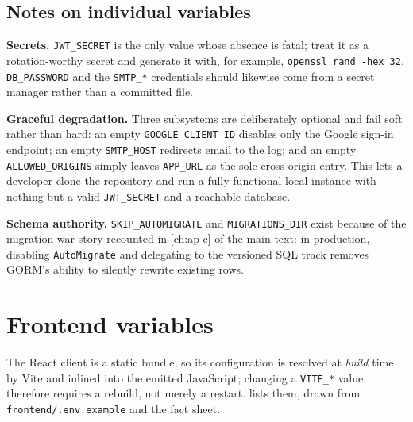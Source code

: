 \subsection{Notes on individual variables}

\textbf{Secrets.} \texttt{JWT\_SECRET} is the only value whose absence is fatal; treat it as a rotation-worthy secret and generate it with, for example, \texttt{openssl rand -hex 32}. \texttt{DB\_PASSWORD} and the \texttt{SMTP\_*} credentials should likewise come from a secret manager rather than a committed file.

\textbf{Graceful degradation.} Three subsystems are deliberately optional and fail soft rather than hard: an empty \texttt{GOOGLE\_CLIENT\_ID} disables only the Google sign-in endpoint; an empty \texttt{SMTP\_HOST} redirects email to the log; and an empty \texttt{ALLOWED\_ORIGINS} simply leaves \texttt{APP\_URL} as the sole cross-origin entry. This lets a developer clone the repository and run a fully functional local instance with nothing but a valid \texttt{JWT\_SECRET} and a reachable database.

\textbf{Schema authority.} \texttt{SKIP\_AUTOMIGRATE} and \texttt{MIGRATIONS\_DIR} exist because of the migration war story recounted in \cref{ch:ap-c} of the main text: in production, disabling \texttt{AutoMigrate} and delegating to the versioned SQL track removes GORM's ability to silently rewrite existing rows.

\section{Frontend variables}

The React client is a static bundle, so its configuration is resolved at \emph{build} time by Vite and inlined into the emitted JavaScript; changing a \texttt{VITE\_*} value therefore requires a rebuild, not merely a restart.  lists them, drawn from \texttt{frontend/.env.example} and the fact sheet.

